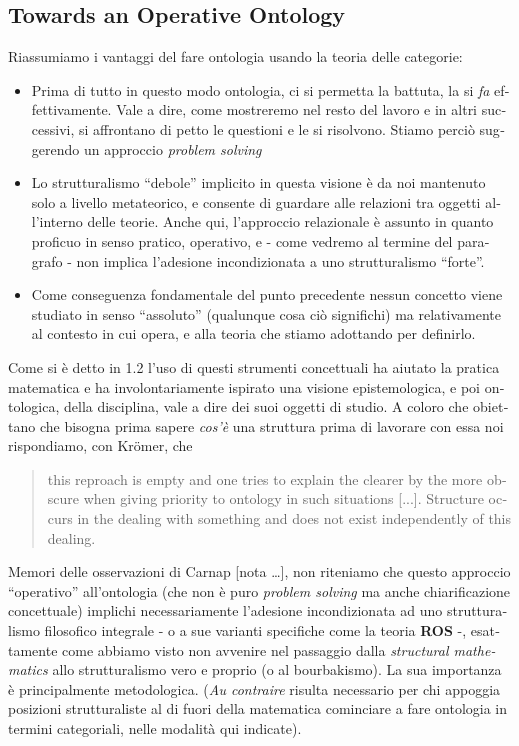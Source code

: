 \begin{italian}
\subsection{Towards an Operative Ontology}


Riassumiamo i vantaggi del fare ontologia usando la teoria delle categorie:
\begin{itemize}
	\item Prima di tutto in questo modo ontologia, ci si permetta la battuta, la si \emph{fa} effettivamente. Vale a dire, come mostreremo nel resto del lavoro e in altri successivi, si affrontano di petto le questioni e le si risolvono. Stiamo perciò suggerendo un approccio \emph{problem solving}
	\item Lo strutturalismo ``debole'' implicito in questa visione è da noi mantenuto solo a livello metateorico, e consente di guardare alle relazioni tra oggetti all'interno delle teorie. Anche qui, l'approccio relazionale è assunto in quanto proficuo in senso pratico, operativo, e - come vedremo al termine del paragrafo - non implica l'adesione incondizionata a uno strutturalismo ``forte''.
	\item Come conseguenza fondamentale del punto precedente nessun concetto viene studiato in senso ``assoluto'' (qualunque cosa ciò significhi) ma relativamente al contesto in cui opera, e alla teoria che stiamo adottando per definirlo.
\end{itemize}

Come si è detto in 1.2 l'uso di questi strumenti concettuali ha aiutato la pratica matematica e ha involontariamente ispirato una visione epistemologica, e poi ontologica, della disciplina, vale a dire dei suoi oggetti di studio. A coloro che obiettano che bisogna prima sapere \textit{cos'è} una struttura prima di lavorare con essa noi rispondiamo, con Kr\"omer, che
\begin{quote}
	this reproach is empty and one tries to explain the clearer by the more obscure when giving priority to ontology in such situations [...]. Structure occurs in the dealing with something and does
	not exist independently of this dealing. \cite{kromer2007tool}
\end{quote}
Memori delle osservazioni di Carnap [nota \dots], non riteniamo che questo approccio ``operativo'' all'ontologia (che non è puro \textit{problem solving} ma anche chiarificazione concettuale) implichi necessariamente l'adesione incondizionata ad uno strutturalismo filosofico integrale - o a sue varianti specifiche come la teoria \textbf{ROS} -, esattamente come abbiamo visto non avvenire nel passaggio dalla \textit{structural mathematics} allo strutturalismo vero e proprio (o al bourbakismo). La sua importanza è principalmente metodologica. (\textit{Au contraire} risulta necessario per chi appoggia posizioni strutturaliste al di fuori della matematica cominciare a fare ontologia in termini categoriali, nelle modalità qui indicate).
\end{italian}


